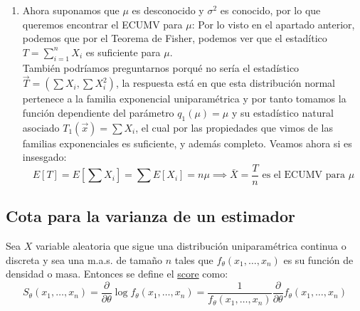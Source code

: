 {\begin{enumerate}
          la familia exponencial uniparamétrica. Entonces sabemos que los estadísticos
          naturales asociados a las funciónes paramétricas $q_i(\theta)$ son completos,
          si éstas ultimas contienen un abierto en su imagen. En este caso, $q_1(\mu,
            \sigma^2) = \mu$ y $q_2(\mu, \sigma^2) = \frac{1}{2\sigma^2}$ contienen un
          abierto en su imagen, por lo que $T$ es completo para $(\mu, \sigma^2)$. \\
          Veamos la esperanza de $T$: $$E[T] = E[(\sum X_i, \sum X_i^2)] = (\sum E[X_i],
            \sum E[X_i^2]) = (n\mu, n\sigma^2 + n\mu^2)$$ $$\implies \frac{\sum X_i}{n} =
            \bar{X} \text{ es el ECUMV para } \mu \text{ y } S^2 = \frac{1}{n-1}\sum_{i =
              1}^{n}(X_i - \bar{X})^2 \text{ es el ECUMV para } \sigma^2$$
    \item Ahora suponamos que $\mu$ es desconocido y $\sigma^2$ es conocido, por lo que
          queremos encontrar el ECUMV para $\mu$: Por lo visto en el apartado anterior,
          podemos que por el Teorema de Fisher, podemos ver que el estadítico $T =
            \sum_{i = 1}^{n} X_i$ es suficiente para $\mu$. \\También podríamos
          preguntarnos porqué no sería el estadístico $\vec{T} = (\sum X_i, \sum X_i^2)$,
          la respuesta está en que esta distribución normal pertenece a la familia
          exponencial uniparamétrica y por tanto tomamos la función dependiente del
          parámetro $q_1(\mu) = \mu$ y su estadístico natural asociado $T_1(\vec{x}) =
            \sum X_i$, el cual por las propiedades que vimos de las familias exponenciales
          es suficiente, y además completo. Veamos ahora si es insesgado: $$E[T] = E[\sum
                X_i] = \sum E[X_i] = n\mu \implies \bar{X} = \frac{T}{n} \text{ es el ECUMV
              para } \mu$$
  \end{enumerate}
}

\subsection{Cota para la varianza de un estimador}
\begin{definición}[Score]
  Sea $X$ variable aleatoria que sigue una distribución uniparamétrica continua o discreta y sea una m.a.s. de tamaño $n$ tales que $f_{\theta}(x_1, \ldots, x_n)$ es su función de densidad o masa. Entonces se define el \underline{score} como: 
  $$S_{\theta}(x_1, \ldots, x_n) = \frac{\partial}{\partial \theta} \log f_{\theta}(x_1, \ldots, x_n) = \frac{1}{f_{\theta}(x_1, \ldots, x_n)}\frac{\partial}{\partial \theta} f_{\theta}(x_1, \ldots, x_n) $$
\end{definición}

